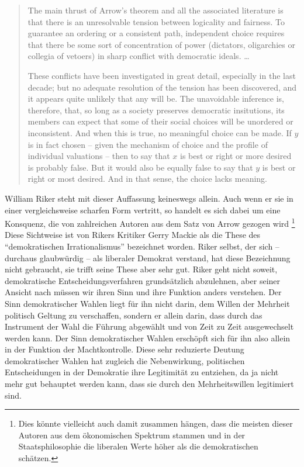 \begin{small}
\begin{quotation}
The main thrust of Arrow's theorem and all the associated literature is that
there is an unresolvable tension between logicality and fairness. To guarantee
an ordering or a consistent path, independent choice requires that there be
some sort of concentration of power (dictators, oligarchies or collegia of
vetoers) in sharp conflict with democratic ideals. \ldots

These conflicts have been investigated in great detail, especially in the last
decade; but no adequate resolution of the tension has been discovered, and it
appears quite unlikely that any will be. The unavoidable inference is,
therefore, that, so long as a society preserves democratic insitutions, its
members can expect that some of their social choices will be unordered or
inconsistent. And when this is true, no meaningful choice can be made. If $y$
is in fact chosen -- given the mechanism of choice and the profile of
individual valuations -- then to say that $x$ is best or right or more desired
is probably false. But it would also be equally false to say that $y$ is best
or right or most desired. And in that sense, the choice lacks meaning.
\cite[S. 136]{riker:1982}
\end{quotation}
\end{small}

William Riker steht mit dieser Auffassung keineswegs allein. Auch wenn er sie in
einer vergleichsweise scharfen Form vertritt, so handelt es sich dabei um eine
Konsquenz, die von zahlreichen Autoren aus dem Satz von Arrow gezogen wird
\cite[S. 10-15]{mackie:2003}\footnote{Dies könnte vielleicht auch damit zusammen
hängen, dass die meisten dieser Autoren aus dem ökonomischen Spektrum stammen und
in der Staatsphilosophie die liberalen Werte höher als die demokratischen
schätzen.} Diese Sichtweise ist von Rikers Kritiker Gerry Mackie als die These
des "`demokratischen Irrationalismus"' bezeichnet worden. Riker selbst, der sich
-- durchaus glaubwürdig -- als liberaler Demokrat verstand, hat diese Bezeichnung
nicht gebraucht, sie trifft seine These aber sehr gut. Riker geht nicht soweit,
demokratische Entscheidungsverfahren grundsätzlich abzulehnen, aber seiner
Ansicht nach müssen wir ihren Sinn und ihre Funktion anders verstehen. Der Sinn
demokratischer Wahlen liegt für ihn nicht darin, dem Willen der Mehrheit
politisch Geltung zu verschaffen, sondern er allein darin, dass durch das
Instrument der Wahl die Führung abgewählt und von Zeit zu Zeit ausgewechselt
werden kann. Der Sinn demokratischer Wahlen erschöpft sich für ihn also allein in
der Funktion der Machtkontrolle. Diese sehr reduzierte Deutung demokratischer
Wahlen hat zugleich die Nebenwirkung, politischen Entscheidungen in der
Demokratie ihre Legitimität zu entziehen, da ja nicht mehr gut behauptet werden
kann, dass sie durch den Mehrheitswillen legitimiert sind.

